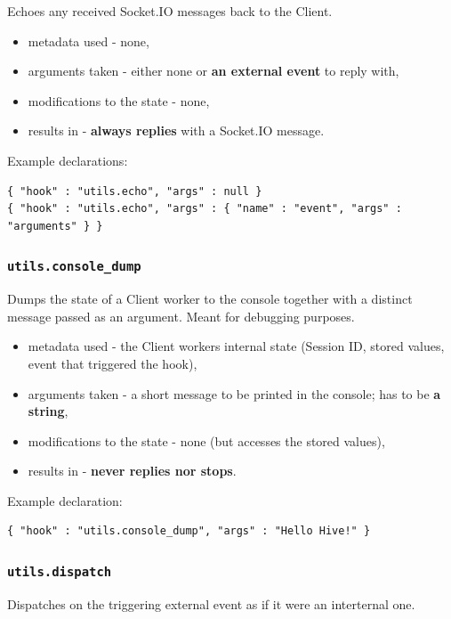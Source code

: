 \documentclass[a4paper]{article}
\begin{document}
Echoes any received Socket.IO messages back to the Client.


\begin{itemize}
\item metadata used - none,
\item arguments taken - either none or \textbf{an external event} to reply with,
\item modifications to the state - none,
\item results in - \textbf{always replies} with a Socket.IO message.
\end{itemize}

\noindent
Example declarations:

\begin{verbatim}
{ "hook" : "utils.echo", "args" : null }
{ "hook" : "utils.echo", "args" : { "name" : "event", "args" : "arguments" } }
\end{verbatim}
\subsubsection{\texttt{utils.console\_dump}}
\label{sec-8-2-2}

Dumps the state of a Client worker to the console together with a distinct message passed as an argument. Meant for debugging purposes.


\begin{itemize}
\item metadata used - the Client workers internal state (Session ID, stored values, event that triggered the hook),
\item arguments taken - a short message to be printed in the console; has to be \textbf{a string},
\item modifications to the state - none (but accesses the stored values),
\item results in - \textbf{never replies nor stops}.
\end{itemize}

\noindent
Example declaration:

\begin{verbatim}
{ "hook" : "utils.console_dump", "args" : "Hello Hive!" }
\end{verbatim}
\subsubsection{\texttt{utils.dispatch}}
\label{sec-8-2-3}

Dispatches on the triggering external event as if it were an interternal one.
\end{document}
